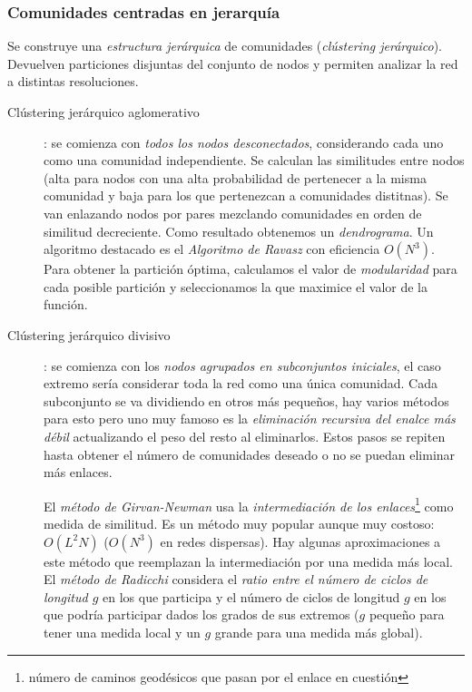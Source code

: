 \documentclass[10pt,spanish, landscape, twocolumn]{article}
\begin{document}
\subsubsection{\textcolor{temaseis}Comunidades centradas en jerarquía}
Se construye una \textit{\textcolor{temaseis}{estructura jerárquica}} de comunidades (\textit{\textcolor{temaseis}{clústering jerárquico}}). Devuelven particiones disjuntas del conjunto de nodos y permiten analizar la red a distintas resoluciones. 

\begin{description}
    \item[Clústering jerárquico aglomerativo]: se comienza con \textit{\textcolor{temaseis}{todos los nodos desconectados}}, considerando cada uno como una comunidad independiente. Se calculan las similitudes entre nodos (alta para nodos con una alta probabilidad de pertenecer a la misma comunidad y baja para los que pertenezcan a comunidades distitnas). Se van enlazando nodos por pares mezclando comunidades en orden de similitud decreciente. Como resultado obtenemos un \textit{\textcolor{temaseis}{dendrograma}}. Un algoritmo destacado es el \textit{\textcolor{temaseis}{Algoritmo de Ravasz}} con eficiencia $O(N^3)$. Para obtener la partición óptima, calculamos el valor de \textit{\textcolor{temaseis}{modularidad}} para cada posible partición y seleccionamos la que maximice el valor de la función.
    \item[Clústering jerárquico divisivo]: se comienza con los \textit{\textcolor{temaseis}{nodos agrupados en subconjuntos iniciales}}, el caso extremo sería considerar toda la red como una única comunidad. Cada subconjunto se va dividiendo en otros más pequeños, hay varios métodos para esto pero uno muy famoso es la \textit{\textcolor{temaseis}{eliminación recursiva del enalce más débil}} actualizando el peso del resto al eliminarlos. Estos pasos se repiten hasta obtener el número de comunidades deseado o no se puedan eliminar más enlaces. 

    El \textit{\textcolor{temaseis}{método de Girvan-Newman}} usa la \textit{\textcolor{temaseis}{intermediación de los enlaces}}\footnote{número de caminos geodésicos que pasan por el enlace en cuestión} como medida de similitud. Es un método muy popular aunque muy costoso: $O(L^2N)$ ($O(N^3)$ en redes dispersas). Hay algunas aproximaciones a este método que reemplazan la intermediación por una medida más local. El \textit{\textcolor{temaseis}{método de Radicchi}} considera el \textit{\textcolor{temaseis}{ratio entre el número de ciclos de longitud $g$}} en los que participa y el número de ciclos de longitud $g$ en los que podría participar dados los grados de sus extremos ($g$ pequeño para tener una medida local y un $g$ grande para una medida más global).
\end{description}
\end{document}
